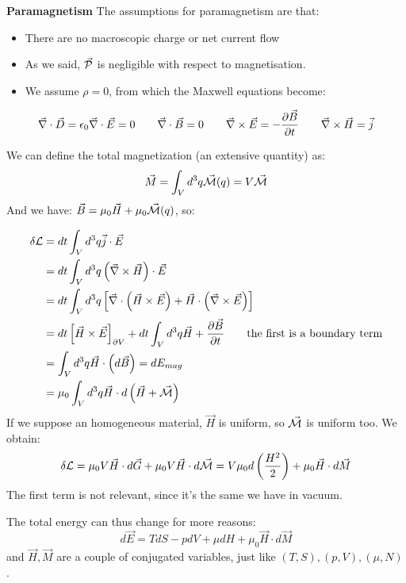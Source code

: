 \textbf{Paramagnetism} The assumptions for paramagnetism are that:
\begin{itemize}
    \item There are no macroscopic charge or net current flow
    \item As we said, $\vec{\mathcal{P}}$ is negligible with respect to magnetisation.
    \item We assume $\rho =0$, from which the Maxwell equations become:
\end{itemize}
$$ \vec \nabla \cdot \vec D = \epsilon_0 \vec \nabla \cdot \vec E = 0 \qquad 
\vec \nabla \cdot \vec B = 0 \qquad
\vec \nabla \times \vec E = -\frac{\partial\vec B}{\partial t} \qquad
\vec \nabla \times \vec H = \vec j $$

We can define the total magnetization (an extensive quantity) as:
$$ \vec M = \int_V d^3 q \vec {\mathcal{M}}(q) = V\vec {\mathcal{M}}$$
And we have: $\vec B = \mu_0 \vec H + \mu_0 \vec {\mathcal{M}}(q)$, so:

\begin{align*}
\delta \mathcal{L}  &= dt \int_V d^3 q \vec j \cdot \vec E \\
&= dt \int_V d^3 q \left(\vec \nabla \times \vec H\right) \cdot \vec E \\
&= dt \int_V d^3q\left[\vec \nabla \cdot \left(\vec H \times \vec E\right) + \vec H \cdot \left(\vec \nabla \times \vec E\right)\right] \\
&= dt \left[\vec H \times \vec E\right]_{\partial V} + dt \int_V d^3 q \vec H + \frac{\partial\vec B}{\partial t} \qquad \text{the first is a boundary term}\\
&= \int_V d^3 q \vec H \cdot \left(d \vec B\right) = d E_{mag} \\
&= \mu_0 \int_V d^3 q \vec H \cdot d\left(\vec H + \vec {\mathcal{M}}\right)
\end{align*}
If we suppose an homogeneous material, $\vec H$ is uniform, so $\vec {\mathcal{M}} $ is uniform too. We obtain:
$$ \delta \mathcal{L} = \mu_0 V \vec H \cdot d \vec G + \mu_0 V \vec H \cdot d\vec {\mathcal{M}} 
= V\mu_0 d \left(\frac{H^2}2\right) + \mu_0 \vec H \cdot d\vec M$$
The first term is not relevant, since it's the same we have in vacuum.

The total energy can thus change for more reasons:
$$ d\vec  E = TdS - pdV + \mu dH + \mu_0 \vec H \cdot d\vec M$$
and $\vec H, \vec M$ are a couple of conjugated variables, just like $(T,S), (p,V), (\mu,N)$.

